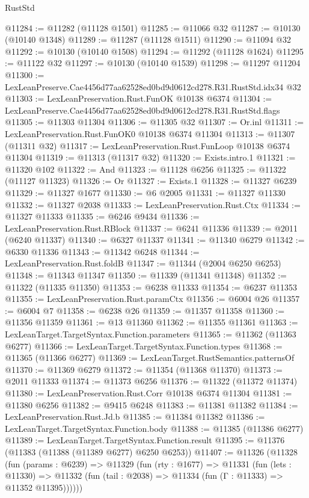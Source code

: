 \begin{lexlean}{RustStd}
\begin{coremodule}
@11284 := @11282 (@11128 @1501)
@11285 := @11066 @32
@11287 := @10130 (@10140 @1348)
@11289 := @11287 (@11128 @1511)
@11290 := @11094 @32
@11292 := @10130 (@10140 @1508)
@11294 := @11292 (@11128 @1624)
@11295 := @11122 @32
@11297 := @10130 (@10140 @1539)
@11298 := @11297 @11204
@11300 := LexLeanPreserve.Cae4456d77aa62528ed0bd9d0612cd278.R31.RustStd.idx34 @32
@11303 := LexLeanPreservation.Rust.FunOK @10138 @6374
@11304 := LexLeanPreserve.Cae4456d77aa62528ed0bd9d0612cd278.R31.RustStd.flags
@11305 := @11303 @11304
@11306 := @11305 @32
@11307 := Or.inl
@11311 := LexLeanPreservation.Rust.FunOK0 @10138 @6374 @11304
@11313 := @11307 (@11311 @32)
@11317 := LexLeanPreservation.Rust.FunLoop @10138 @6374 @11304
@11319 := @11313 (@11317 @32)
@11320 := Exists.intro.{1}
@11321 := @11320 @102
@11322 := And
@11323 := @11128 @6256
@11325 := @11322 (@11127 @11323)
@11326 := Or
@11327 := Exists.{1}
@11328 := @11327 @6239
@11329 := @11327 @1677
@11330 := @6 @2005
@11331 := @11327 @11330
@11332 := @11327 @2038
@11333 := LexLeanPreservation.Rust.Ctx
@11334 := @11327 @11333
@11335 := @6246 @9434
@11336 := LexLeanPreservation.Rust.RBlock
@11337 := @6241 @11336
@11339 := @2011 (@6240 @11337)
@11340 := @6327 @11337
@11341 := @11340 @6279
@11342 := @6330 @11336
@11343 := @11342 @6248
@11344 := LexLeanPreservation.Rust.foldB
@11347 := @11344 (@2004 @6250 @6253)
@11348 := @11343 @11347
@11350 := @11339 (@11341 @11348)
@11352 := @11322 (@11335 @11350)
@11353 := @6238 @11333
@11354 := @6237 @11353
@11355 := LexLeanPreservation.Rust.paramCtx
@11356 := @6004 @26
@11357 := @6004 @7
@11358 := @6238 @26
@11359 := @11357 @11358
@11360 := @11356 @11359
@11361 := @13 @11360
@11362 := @11355 @11361
@11363 := LexLeanTarget.TargetSyntax.Function.parameters
@11365 := @11362 (@11363 @6277)
@11366 := LexLeanTarget.TargetSyntax.Function.types
@11368 := @11365 (@11366 @6277)
@11369 := LexLeanTarget.RustSemantics.patternsOf
@11370 := @11369 @6279
@11372 := @11354 (@11368 @11370)
@11373 := @2011 @11333
@11374 := @11373 @6256
@11376 := @11322 (@11372 @11374)
@11380 := LexLeanPreservation.Rust.Corr @10138 @6374 @11304
@11381 := @11380 @6256
@11382 := @9415 @6248
@11383 := @11381 @11382
@11384 := LexLeanPreservation.Rust.Jd.b
@11385 := @11384 @11382
@11386 := LexLeanTarget.TargetSyntax.Function.body
@11388 := @11385 (@11386 @6277)
@11389 := LexLeanTarget.TargetSyntax.Function.result
@11395 := @11376 (@11383 (@11388 (@11389 @6277) @6250 @6253))
@11407 := @11326
    (@11328
      (fun (params : @6239) =>
      @11329
        (fun (rty : @1677) =>
        @11331
          (fun (lets : @11330) =>
          @11332 (fun (tail : @2038) => @11334 (fun (Γ : @11333) => @11352 @11395))))))

\end{coremodule}
\end{lexlean}
